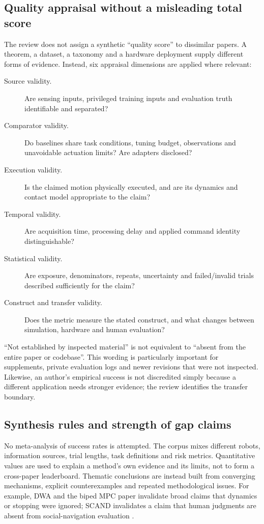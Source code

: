 \subsection{Quality appraisal without a misleading total score}
The review does not assign a synthetic ``quality score'' to dissimilar papers.
A theorem, a dataset, a taxonomy and a hardware deployment supply different
forms of evidence. Instead, six appraisal dimensions are applied where relevant:
\begin{description}
\item[Source validity.] Are sensing inputs, privileged training inputs and
evaluation truth identifiable and separated?
\item[Comparator validity.] Do baselines share task conditions, tuning budget,
observations and unavoidable actuation limits? Are adapters disclosed?
\item[Execution validity.] Is the claimed motion physically executed, and are
its dynamics and contact model appropriate to the claim?
\item[Temporal validity.] Are acquisition time, processing delay and applied
command identity distinguishable?
\item[Statistical validity.] Are exposure, denominators, repeats, uncertainty
and failed/invalid trials described sufficiently for the claim?
\item[Construct and transfer validity.] Does the metric measure the stated
construct, and what changes between simulation, hardware and human evaluation?
\end{description}
``Not established by inspected material'' is not equivalent to ``absent from the
entire paper or codebase''. This wording is particularly important for supplements,
private evaluation logs and newer revisions that were not inspected. Likewise,
an author's empirical success is not discredited simply because a different
application needs stronger evidence; the review identifies the transfer boundary.

\subsection{Synthesis rules and strength of gap claims}
No meta-analysis of success rates is attempted. The corpus mixes different
robots, information sources, trial lengths, task definitions and risk metrics.
Quantitative values are used to explain a method's own evidence and its limits,
not to form a cross-paper leaderboard. Thematic conclusions are instead built
from converging mechanisms, explicit counterexamples and repeated methodological
issues. For example, DWA and the biped MPC paper invalidate broad claims that
dynamics or stopping were ignored; SCAND invalidates a claim that human judgments
are absent from social-navigation evaluation \citep{dwa,biped2016,scand}.

